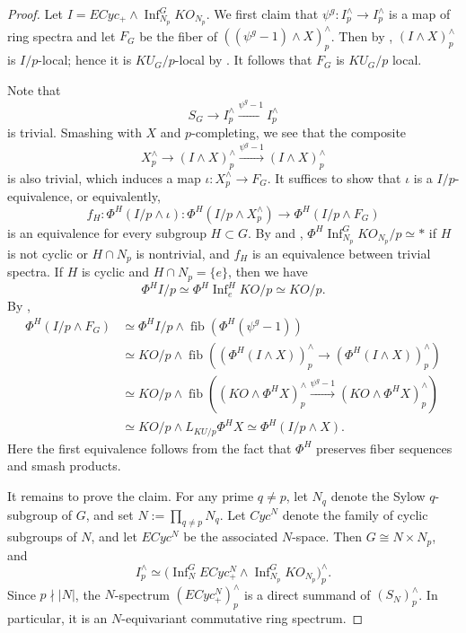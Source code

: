 \documentclass{amsart}
\theoremstyle{plain}
\theoremstyle{definition}
\theoremstyle{remark}
\begin{document}
\begin{proof}
    Let $I=ECyc_+\wedge \operatorname{Inf}_{N_p}^G KO_{N_p}$. We first claim that $\psi^g:I_p^\wedge \to I_p^\wedge$ is a map of ring spectra and let $F_G$ be the fiber of $((\psi^g - 1)\wedge X)_p^\wedge$. Then by , $(I\wedge X)_p^{\wedge}$ is $I/p$-local; hence it is $KU_G/p$-local by . It follows that $F_G$ is $KU_G/p$ local. 
    
    Note that 
    \[
    S_G\longrightarrow I_p^\wedge \overset{\psi^g-1}{\longrightarrow} I_p^\wedge
    \]
    is trivial. Smashing with $X$ and $p$-completing, we see that the composite 
    \[
    X_p^\wedge \longrightarrow (I\wedge X)_p^\wedge \overset{\psi^g-1}{\longrightarrow} (I\wedge X)_p^\wedge
    \]
    is also trivial, which induces a map $\iota: X_p^\wedge \to F_G$. It suffices to show that $\iota$ is a $I/p$-equivalence, or equivalently, 
    \[ 
    f_H:\Phi^H(I/p\wedge \iota): \Phi^H (I/p\wedge X_p^\wedge)\to \Phi^H (I/p\wedge F_G)
    \] 
    is an equivalence for every subgroup $H\subset G$. 
    By  and , $\Phi^H \operatorname{Inf}_{N_p}^G KO_{N_p}/p\simeq \ast$ if $H$ is not cyclic or $H\cap N_p$ is nontrivial, and $f_H$ is an equivalence between trivial spectra. If $H$ is cyclic and $H\cap N_p=\{e\}$, then we have
    \[
    \Phi^H I/p\simeq \Phi^H\operatorname{Inf}_e^H KO/p\simeq KO/p.
    \]
    By , 
    \[
    \begin{aligned}
        \Phi^H (I/p\wedge F_G) & \simeq \Phi^H I/p \wedge \operatorname{fib}(\Phi^H(\psi^g-1))\\
        &\simeq KO/p \wedge \operatorname{fib}((\Phi^H (I\wedge X))_p^\wedge\longrightarrow (\Phi^H(I\wedge X))_p^\wedge)\\
        &\simeq KO/p \wedge \operatorname{fib}((KO\wedge \Phi^H X)_p^\wedge\overset{\psi^g-1}{\longrightarrow} (KO\wedge \Phi^H X)_p^\wedge)\\
        &\simeq KO/p \wedge L_{KU/p}\Phi^H X \simeq \Phi^H(I/p\wedge X).
    \end{aligned}
    \]
    Here the first equivalence follows from the fact that $\Phi^H$ preserves fiber sequences and smash products.  

    It remains to prove the claim. For any prime $q\neq p$, let $N_q$ denote the Sylow $q$-subgroup of $G$, and set $N:=\prod_{q\neq p}N_q$.
    Let $Cyc^{N}$ denote the family of cyclic subgroups of $N$, and let $ECyc^N$ be the associated $N$-space. Then $G\cong N\times N_p$, and
    \[
    I_p^\wedge \simeq
    \bigl(\operatorname{Inf}_N^G ECyc^N_+
    \wedge
    \operatorname{Inf}_{N_p}^G KO_{N_p}\bigr)_p^\wedge.
    \]
    Since $p\nmid |N|$, the $N$-spectrum $(ECyc^N_+)_p^\wedge$ is a direct summand of $(S_N)_p^\wedge$. In particular, it is an $N$-equivariant commutative ring spectrum.
    

\end{proof}
\end{document}
